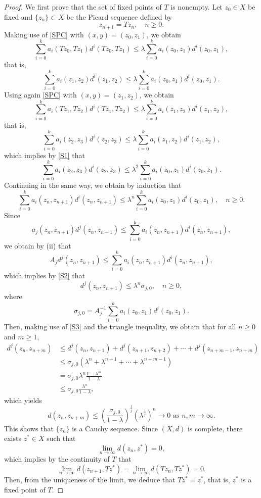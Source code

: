\documentclass[10pt,a4paper]{amsart}
\begin{document}
\begin{proof}
We first prove that the set of fixed points of $T$ is nonempty.  Let $z_0\in X$ be fixed and  $\{z_n\}\subset X$ be the Picard sequence defined by  
$$
z_{n+1}=Tz_n,\quad  n\geq 0.
$$
Making use of \eqref{SPC} with $(x,y)=(z_0,z_1)$, we obtain
$$
\sum_{i=0}^ka_i(Tz_0,Tz_1)d^i(Tz_0,Tz_1)\leq \lambda \sum_{i=0}^k a_i(z_0,z_1)d^i(z_0,z_1),
$$
that is,
\begin{equation}\label{S1}
\sum_{i=0}^ka_i(z_1,z_2)d^i(z_1,z_2)\leq \lambda \sum_{i=0}^k a_i(z_0,z_1)d^i(z_0,z_1).
\end{equation}
Using again \eqref{SPC} with $(x,y)=(z_1,z_2)$, we obtain
$$
\sum_{i=0}^ka_i(Tz_1,Tz_2)d^i(Tz_1,Tz_2)\leq \lambda \sum_{i=0}^k a_i(z_1,z_2)d^i(z_1,z_2),
$$
that is,
$$
\sum_{i=0}^ka_i(z_2,z_3)d^i(z_2,z_3)\leq \lambda \sum_{i=0}^k a_i(z_1,z_2)d^i(z_1,z_2),
$$
which implies by \eqref{S1} that 
$$
\sum_{i=0}^ka_i(z_2,z_3)d^i(z_2,z_3)\leq \lambda^2 \sum_{i=0}^k a_i(z_0,z_1)d^i(z_0,z_1). 
$$
Continuing in the same way, we obtain by induction that   
\begin{equation}\label{S2}
\sum_{i=0}^ka_i(z_n,z_{n+1})d^i(z_n,z_{n+1})\leq \lambda^n \sum_{i=0}^k a_i(z_0,z_1)d^i(z_0,z_1),\quad n\geq 0.  	
\end{equation}
Since 
$$
a_j(z_n,z_{n+1})d^j(z_n,z_{n+1})\leq \sum_{i=0}^ka_i(z_n,z_{n+1})d^i(z_n,z_{n+1}),
$$
we obtain by (ii) that 
$$
A_j d^j(z_n,z_{n+1})\leq \sum_{i=0}^ka_i(z_n,z_{n+1})d^i(z_n,z_{n+1}),
$$
which implies by \eqref{S2} that 
\begin{equation}\label{S3}
d^j(z_n,z_{n+1})\leq  \lambda^n \sigma_{j,0},\quad n\geq 0,	
\end{equation}
where 
\begin{equation}\label{sigma0}
\sigma_{j,0}=A_j^{-1}\sum_{i=0}^k a_i(z_0,z_1)d^i(z_0,z_1).
\end{equation}
Then, making use of \eqref{S3} and the triangle inequality, we obtain that for all $n\geq 0$ and $m\geq 1$,
$$
\begin{aligned}
d^j(z_n,z_{n+m})&\leq d^j(z_n,z_{n+1})+d^j(z_{n+1},z_{n+2})+\cdots+d^j(z_{n+m-1},z_{n+m})\\
&\leq \sigma_{j,0}\left(	\lambda^n+\lambda^{n+1}+\cdots+\lambda^{n+m-1}\right)\\
&=\sigma_{j,0} \lambda^n \frac{1-\lambda^{m}}{1-\lambda}\\
&\leq \sigma_{j,0}  \frac{\lambda^n}{1-\lambda},
\end{aligned}
$$
which yields
$$
d(z_n,z_{n+m})\leq \left(\frac{\sigma_{j,0} }{1-\lambda}\right)^{\frac{1}{j}} (\lambda^{\frac{1}{j}})^n\to 0\mbox{ as }n,m\to \infty.
$$
This shows that $\{z_n\}$ is a Cauchy sequence. Since $(X,d)$ is complete, there exists $z^*\in X$ such that 
$$
\lim_{n\to \infty}d(z_n,z^*)=0,
$$
which implies by the continuity of $T$ that 
$$
\lim_{n\to \infty}d(z_{n+1},Tz^*)=\lim_{n\to \infty}d(Tz_n,Tz^*)=0.
$$
Then, from the uniqueness of the limit, we deduce that $Tz^*=z^*$, that is, $z^*$ is a fixed point of $T$. 


\end{proof}
\end{document}
